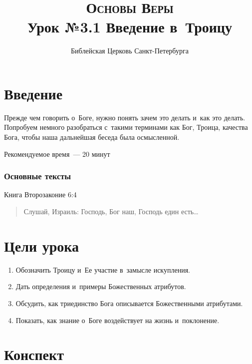 \documentclass[a4paper,12pt]{article}
\title{\textsc{Основы Веры}\\Урок №3.1 Введение в~Троицу}
\author{Библейская Церковь Санкт-Петербурга}
\date{}
\begin{document}
\maketitle

\thispagestyle{empty}

\tableofcontents

\newcommand{\myline}{\noindent\makebox[\linewidth]{\rule{\linewidth}{0.1pt}}}


\section*{Введение}
Прежде чем говорить о~Боге, нужно понять зачем это делать и~как это делать. Попробуем немного разобраться с~такими терминами как Бог, Троица, качества Бога, чтобы наша дальнейшая беседа была осмысленной.

Рекомендуемое время~--- 20 минут
        
\subsubsection*{Основные тексты}

Книга Второзаконие 6:4
\begin{quote}
Слушай, Израиль: Господь, Бог наш, Господь един есть\ldots    
\end{quote}

    

\section*{Цели урока}
\begin{enumerate}
    \item Обозначить Троицу и~Ее участие в~замысле искупления.
    \item Дать определения и~примеры Божественных атрибутов.
    \item Обсудить, как триединство Бога описывается Божественными атрибутами.
    \item Показать, как знание о~Боге воздействует на жизнь и~поклонение.
\end{enumerate}

\section*{Конспект}
\end{document}
